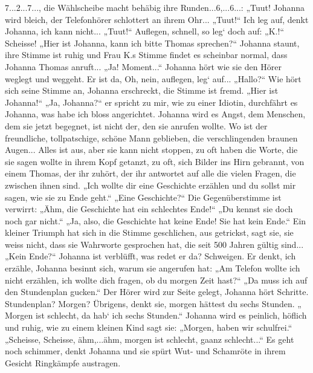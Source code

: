 7...2...7..., die Wählscheibe macht behäbig ihre Runden...6,...6...: „Tuut! Johanna wird bleich, der Telefonhörer schlottert an ihrem Ohr... „Tuut!“ Ich leg auf, denkt Johanna, ich kann nicht... „Tuut!“
Auflegen, schnell, so leg` doch auf: „K.!“ Scheisse!
„Hier ist Johanna, kann ich bitte Thomas sprechen?“ Johanna staunt, ihre Stimme ist ruhig und Frau K.s Stimme findet es scheinbar normal, dass Johanna Thomas anruft... „Ja! Moment...“ Johanna hört wie sie den Hörer weglegt und weggeht. Er ist da, Oh, nein, auflegen, leg` auf... „Hallo?“ Wie hört sich seine Stimme an, Johanna erschreckt, die Stimme ist fremd.
„Hier ist Johanna!“ „Ja, Johanna?“ er spricht zu mir, wie zu einer Idiotin, durchfährt es Johanna, was habe ich bloss angerichtet. Johanna wird es Angst, dem Menschen, dem sie jetzt begegnet, ist nicht der, den sie anrufen wollte. Wo ist der freundliche, tollpatschige, schöne Mann geblieben, die verschlingenden braunen Augen... Alles ist aus, aber sie kann nicht stoppen, zu oft haben die Worte, die sie sagen wollte in ihrem Kopf getanzt, zu oft, sich Bilder ins Hirn gebrannt, von einem Thomas, der ihr zuhört, der ihr antwortet auf alle die vielen Fragen, die zwischen ihnen sind.
„Ich wollte dir eine Geschichte erzählen und du sollst mir sagen, wie sie zu Ende geht.“ „Eine Geschichte?“ Die Gegenüberstimme ist verwirrt: „Ähm, die Geschichte hat ein schlechtes Ende!“ „Du kennst sie doch noch gar nicht.“ „Ja, also, die Geschichte hat keine Ende! Sie hat kein Ende.“ Ein kleiner Triumph hat sich in die Stimme geschlichen, aus getrickst, sagt sie, sie weiss nicht, dass sie Wahrworte gesprochen hat, die seit 500 Jahren gültig sind...
„Kein Ende?“ Johanna ist verblüfft, was redet er da? Schweigen.
Er denkt, ich erzähle, Johanna besinnt sich, warum sie angerufen hat: „Am Telefon wollte ich nicht erzählen, ich wollte dich fragen, ob du morgen Zeit hast?“ „Da muss ich auf den Stundenplan gucken.“ Der Hörer wird zur Seite gelegt, Johanna hört Schritte. Stundenplan? Morgen? Übrigens, denkt sie, morgen hättest du sechs Stunden. „ Morgen ist schlecht, da hab` ich sechs Stunden.“ Johanna wird es peinlich, höflich und ruhig, wie zu einem kleinen Kind sagt sie: „Morgen, haben wir schulfrei.“ „Scheisse, Scheisse, ähm,...ähm, morgen ist schlecht, gaanz schlecht...“ Es geht noch schimmer, denkt Johanna und sie spürt Wut- und Schamröte in ihrem Gesicht Ringkämpfe austragen.
